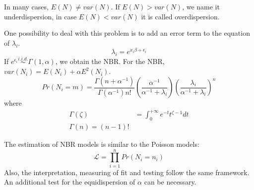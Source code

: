 				
				In many cases, $E(N)\neq var(N)$. If  $E(N) > var(N)$, we name it underdispersion, in case  $E(N)< var(N)$	it is called overdispersion.
				
				One possibility to deal with this problem is to add an error term to the equation of $\lambda_i$.
				\begin{equation*}
					\lambda_i=e^{x_i\beta+\epsilon_i}
				\end{equation*}
				If $e^{\epsilon_i}\overset{i.i.d.}{\sim} \Gamma(1,\alpha)$, we obtain the NBR. For the NBR, $var(N_i)=E(N_i)+\alpha E^2(N_i)$.
				\begin{equation*}
					Pr(N_i=m)=\frac{\Gamma (n+\alpha^{-1})}{\Gamma (\alpha^{-1})n!}\left(\frac{\alpha^{-1}}{\alpha^{-1}+\lambda_i}\right)\left(\frac{\lambda_i}{\alpha^{-1}+\lambda_i}\right)^n
				\end{equation*}
				where
				\begin{align*}
					\Gamma(\zeta)&=\int_{0}^{+\infty} e^{-t} t^{\zeta-1} dt\\
					\Gamma(n)=(n-1)!
				\end{align*}

				The estimation of NBR models is similar to the Poisson models:
				\begin{equation*}
					\mathcal{L}=\prod_{i=1}^{n} Pr(N_i=n_i)
				\end{equation*}
				Also, the interpretation, measuring of fit and testing follow the same framework. An additional test for the equidispersion of $\alpha$ can be necessary.
